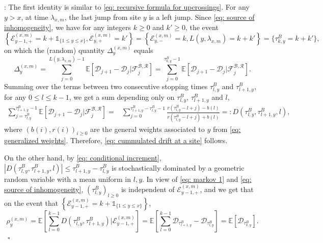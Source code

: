 \documentclass[twoside,12pt,a4paper]{article}
\numberwithin{equation}{section}
\newenvironment{proof}[1][Proof]{{\sc #1}:}{~\hfill $\square$}
\newcommand{\abs}[1]{\left\vert #1 \right\vert}
\begin{document}
 \begin{proof} 
 	The first identity is similar to \eqref{eq: recursive formula for upcrossings}.
 	 For any $y>x $, at time $\lambda_{x,m}$, the last jump from site $y$ is a left jump. Since \eqref{eq: source of inhomogeneity}, we have for any integers $k\geq 0$ and $k' \geq 0$, the event 
 	$$\left\{ \mathcal{E}^{(x,m)}_{y-1,+} =k +  \mathbb{1}_{\{1\leq y\leq x\}}, \mathcal{E}^{(x,m)}_{y,+} = k'\right\} = \left\{\mathcal{E}^{(x,m)}_{y,-} =k,  L(y,\lambda_{x,m}) = k+k' \right\} = \{ \tau^B_{k,y} = k+k' \},$$ on which the (random) quantity $\Delta_{y}^{(x,m)}$ equals
 	\[
 	\Delta_{y}^{(x,m)} =\sum_{j=0}^{ L(y,\lambda_{x,m})-1} \mathbb{E}\left[ \mathcal{D}_{j+1} -\mathcal{D}_{j}  \vert \mathcal{F}^{\mathcal{B},\mathcal{R}}_{j} \right] = \sum_{j=0}^{\tau^B_{k,y}-1} \mathbb{E}\left[ \mathcal{D}_{j+1} -\mathcal{D}_{j}  \vert \mathcal{F}^{\mathcal{B},\mathcal{R}}_{j} \right].  
 	\] 
 	Summing over the terms between two consecutive stopping times $\tau^{B}_{l,y} $ and $\tau^{B}_{l+1,y} $, for any $0\leq l \leq k -1$,  we get a sum depending only on $\tau^{B}_{l,y} $, $\tau^{B}_{l+1,y} $ and $l$, 
 	\begin{align} \label{eq: conditional increment}
 		\sum_{j=\tau^{B}_{l,y}}^{\tau^B_{l+1,y}-1} \mathbb{E}\left[ \mathcal{D}_{j+1} - \mathcal{D}_{j}  \vert \mathcal{F}^{\mathcal{B},\mathcal{R}}_{j} \right] =&
 		\sum_{j=0}^{\tau^B_{l+1,y}-\tau^{B}_{l,y}-1} \frac{ r(\tau^{B}_{l,y}-l + j) - b(l)  }{ r(\tau^{B}_{l,y}-l + j) + b(l)  } 
 		=:  D\left(\tau^{B}_{l,y},\tau^{B}_{l+1,y},l\right),
 	\end{align}   
 	where $(b(i),r(i))_{i\geq 0}$ are the general weights associated to $y$ from \eqref{eq: generalized weights}. Therefore, \eqref{eq: cummulated drift at a site} follows.
 	
 	On the other hand, by \eqref{eq: conditional increment}, $\abs{  D\left(\tau^{B}_{l,y},\tau^{B}_{l+1,y},l\right)} \leq  \tau^{B}_{l+1,y}-\tau^{B}_{l,y}$ is stochastically dominated by a geometric random variable with a mean uniform in $l, y$. In view of \eqref{eq: markov 1} and \eqref{eq: source of inhomogeneity},  $\left(\tau^B_{l,y}\right)_{l \geq 0} $ is independent of $ \mathcal{E}^{(x,m)}_{y-1,+}$, and we get that on the event that ${ \left\{ \mathcal{E}^{(x,m)}_{y-1,+} = k + \mathbb{1}_{\{1\leq y\leq x\}}  \right\} }$, 
 	\begin{equation*} 
 		\rho_{y}^{(x,m)} = \mathbb{E}\left[ \sum_{l=0 }^{ k -1  }  D(\tau^{B}_{l,y},\tau^{B}_{l+1,y} ) \vert \mathcal{E}^{(x,m)}_{y-1,+} \right]	= \mathbb{E}\left[ \sum_{l=0}^{k-1}  \mathcal{D}_{\tau^{B}_{l+1,y}} -\mathcal{D}_{\tau^{B}_{l,y}} \right]  
 		= \mathbb{E}\left[  \mathcal{D}_{\tau^{B}_{k,y}} \right].
 	\end{equation*} 
 \end{proof}
\end{document}
